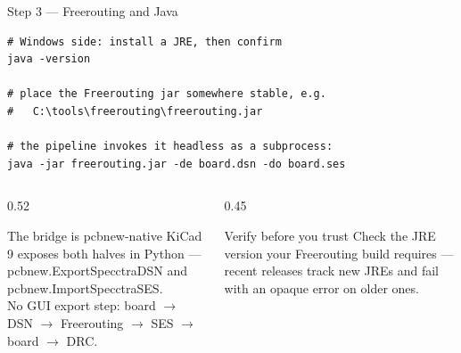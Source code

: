 \documentclass[aspectratio=169,10pt]{beamer}
\newcommand{\code}[1]{{\ttfamily\small #1}}
\begin{document}
\begin{frame}[fragile]{Step 3 --- Freerouting and Java}
\vspace{1mm}
\begin{lstlisting}
# Windows side: install a JRE, then confirm
java -version

# place the Freerouting jar somewhere stable, e.g.
#   C:\tools\freerouting\freerouting.jar

# the pipeline invokes it headless as a subprocess:
java -jar freerouting.jar -de board.dsn -do board.ses
\end{lstlisting}
\vspace{2mm}
\begin{columns}[T]
\begin{column}{0.52\textwidth}
\begin{block}{The bridge is pcbnew-native}
\small
KiCad 9 exposes both halves in Python --- \code{pcbnew.ExportSpecctraDSN} and \code{pcbnew.ImportSpecctraSES}.\\[3pt]
No GUI export step: \code{board $\rightarrow$ DSN $\rightarrow$ Freerouting $\rightarrow$ SES $\rightarrow$ board $\rightarrow$ DRC}.
\end{block}
\end{column}
\begin{column}{0.45\textwidth}
\begin{block}{Verify before you trust}
\small
Check the JRE version your Freerouting build requires --- recent releases track new JREs and fail with an opaque error on older ones.
\end{block}
\end{column}
\end{columns}
\end{frame}
\end{document}
